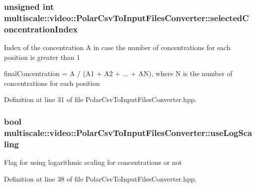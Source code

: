 \hypertarget{classmultiscale_1_1video_1_1PolarCsvToInputFilesConverter_a121d592659f9f5075c8c78aa46c2950c}{
\subsubsection[{selected\-Concentration\-Index}]{\setlength{\rightskip}{0pt plus 5cm}unsigned int {\bf multiscale\-::video\-::\-Polar\-Csv\-To\-Input\-Files\-Converter\-::selected\-Concentration\-Index}}}\label{classmultiscale_1_1video_1_1PolarCsvToInputFilesConverter_a121d592659f9f5075c8c78aa46c2950c}
\-Index of the concentration \-A in case the number of concentrations for each position is greater than 1

final\-Concentration = \-A / (\-A1 + \-A2 + ... + \-A\-N), where \-N is the number of concentrations for each position 

\-Definition at line 31 of file \-Polar\-Csv\-To\-Input\-Files\-Converter.\-hpp.

\hypertarget{classmultiscale_1_1video_1_1PolarCsvToInputFilesConverter_af07bf56fc39bb226a6e2596f35ada0d7}{
\subsubsection[{use\-Log\-Scaling}]{\setlength{\rightskip}{0pt plus 5cm}bool {\bf multiscale\-::video\-::\-Polar\-Csv\-To\-Input\-Files\-Converter\-::use\-Log\-Scaling}}}\label{classmultiscale_1_1video_1_1PolarCsvToInputFilesConverter_af07bf56fc39bb226a6e2596f35ada0d7}
\-Flag for using logarithmic scaling for concentrations or not 

\-Definition at line 38 of file \-Polar\-Csv\-To\-Input\-Files\-Converter.\-hpp.



